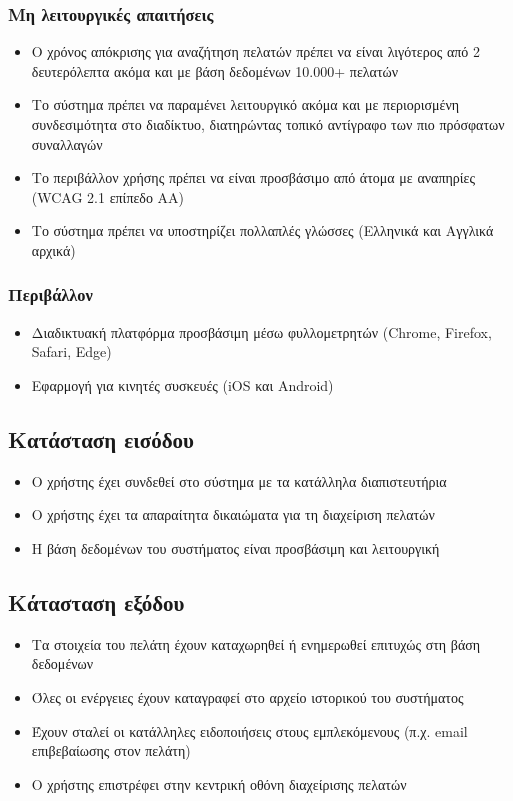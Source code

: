 \documentclass[12pt,a4paper,twoside]{book}
\begin{document}
\subsubsection{Μη λειτουργικές απαιτήσεις}
\begin{itemize}
  \item Ο χρόνος απόκρισης για αναζήτηση πελατών πρέπει να είναι λιγότερος από 2 δευτερόλεπτα ακόμα και με βάση δεδομένων 10.000+ πελατών
  \item Το σύστημα πρέπει να παραμένει λειτουργικό ακόμα και με περιορισμένη συνδεσιμότητα στο διαδίκτυο, διατηρώντας τοπικό αντίγραφο των πιο πρόσφατων συναλλαγών
  \item Το περιβάλλον χρήσης πρέπει να είναι προσβάσιμο από άτομα με αναπηρίες (WCAG 2.1 επίπεδο AA)
  \item Το σύστημα πρέπει να υποστηρίζει πολλαπλές γλώσσες (Ελληνικά και Αγγλικά αρχικά)
\end{itemize}

\subsubsection{Περιβάλλον}
\begin{itemize}
  \item Διαδικτυακή πλατφόρμα προσβάσιμη μέσω φυλλομετρητών (Chrome, Firefox, Safari, Edge)
  \item Εφαρμογή για κινητές συσκευές (iOS και Android)
\end{itemize}

\subsection{Κατάσταση εισόδου}
\begin{itemize}
  \item Ο χρήστης έχει συνδεθεί στο σύστημα με τα κατάλληλα διαπιστευτήρια
  \item Ο χρήστης έχει τα απαραίτητα δικαιώματα για τη διαχείριση πελατών
  \item Η βάση δεδομένων του συστήματος είναι προσβάσιμη και λειτουργική
\end{itemize}

\subsection{Κάτασταση εξόδου}
\begin{itemize}
  \item Τα στοιχεία του πελάτη έχουν καταχωρηθεί ή ενημερωθεί επιτυχώς στη βάση δεδομένων
  \item Όλες οι ενέργειες έχουν καταγραφεί στο αρχείο ιστορικού του συστήματος
  \item Έχουν σταλεί οι κατάλληλες ειδοποιήσεις στους εμπλεκόμενους (π.χ. email επιβεβαίωσης στον πελάτη)
  \item Ο χρήστης επιστρέφει στην κεντρική οθόνη διαχείρισης πελατών %
\end{itemize}
\end{document}

